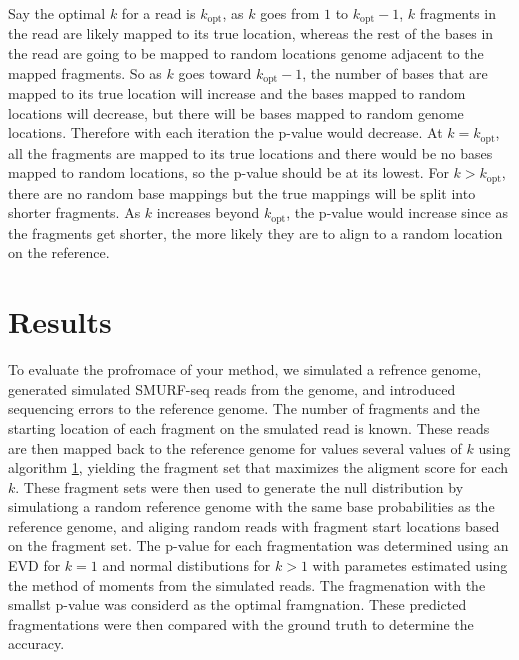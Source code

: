 Say the optimal $k$ for a read is $k_\mathrm{opt}$, as $k$ goes from $1$
to $k_\mathrm{opt}-1$, $k$ fragments in the read are likely mapped to
its true location, whereas the rest of the bases in the read are going
to be mapped to random locations genome adjacent to the mapped
fragments. So as $k$ goes toward $k_\mathrm{opt}-1$, the number of bases
that are mapped to its true location will increase and the bases mapped
to random locations will decrease, but there will be bases mapped to
random genome locations. Therefore with each iteration the p-value
would decrease. At $k=k_\mathrm{opt}$, all the fragments are mapped to
its true locations and there would be no bases mapped to random
locations, so the p-value should be at its lowest. For $k >
k_\mathrm{opt}$, there are no random base mappings but the true mappings
will be split into shorter fragments. As $k$ increases beyond
$k_\mathrm{opt}$, the p-value would increase since as the fragments get
shorter, the more likely they are to align to a random location on the
reference.


\section{Results}
To evaluate the profromace of your method, we simulated a refrence
genome, generated simulated SMURF-seq reads from the genome, and
introduced sequencing errors to the reference genome. The number of
fragments and the starting location of each fragment on the smulated
read is known. These reads are then mapped back to the reference genome
for values several values of $k$ using algorithm \ref{}, yielding the
fragment set that maximizes the aligment score for each $k$. These
fragment sets were then used to generate the null distribution by
simulationg a random reference genome with the same base probabilities
as the reference genome, and aliging random reads with fragment start
locations based on the fragment set. The p-value for each fragmentation
was determined using an EVD for $k=1$ and normal distibutions for $k >
1$ with parametes estimated using the method of moments from the
simulated reads. The fragmenation with the smallst p-value was considerd
as the optimal framgnation. These predicted fragmentations were then
compared with the ground truth to determine the accuracy.

